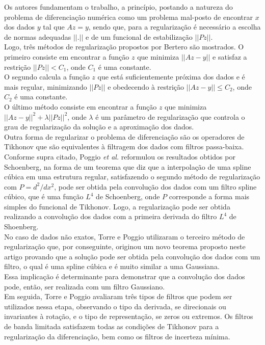\begin{enumerate}
\begin{enumerate}[label*=\arabic*.]
    Os autores fundamentam o trabalho, a princípio, postando a natureza do problema de diferenciação numérica como um problema mal-posto de encontrar $x$ dos dados $y$ tal que $Az = y$, sendo que, para a regularização é necessário a escolha de normas adequadas $||.||$ e de um funcional de estabilização $||Pz||$.
    \\[6pt]
    Logo, três métodos de regularização propostos por Bertero são mostrados. O primeiro consiste em encontrar a função $z$ que minimiza $||Az - y||$ e satisfaz a restrição $||Pz|| < C_{1}$, onde $C_{1}$ é uma constante.
    \\[6pt]
    O segundo calcula a função $z$ que está suficientemente próxima dos dados e é mais regular, minimizando $||Pz||$ e obedecendo à restrição $||Az - y|| \leq C_{2}$, onde $C_{2}$ é uma constante.
    \\[6pt]
    O último método consiste em encontrar a função $z$ que minimiza $||Az - y||^2 + \lambda ||Pz||^2$, onde $\lambda$ é um parâmetro de regularização que controla o grau de regularização da solução e a aproximação dos dados.
    \\[6pt]
    Outra forma de regularizar o problema de diferenciação são os operadores de Tikhonov que são equivalentes à filtragem dos dados com filtros passa-baixa.
    \\[6pt]
    Conforme supra citado, Poggio \textit{et al.} \cite{Poggio1988106} reformulou os resultados obtidos por Schoenberg, na forma de um teorema que diz que a interpolação de uma spline cúbica em uma estrutura regular, satisfazendo o segundo método de regularização com $P = d^2 / dx^2$, pode ser obtida pela convolução dos dados com um filtro spline cúbico, que é uma função $L^4$ de Schoenberg, onde $P$ corresponde a forma mais simples do funcional de Tikhonov. Logo, a regularização pode ser obtida realizando a convolução dos dados com a primeira derivada do filtro $L^4$ de Shoenberg.
    \\[6pt]
    No caso de dados não exatos, Torre e Poggio utilizaram o terceiro método de regularização que, por conseguinte, originou um novo teorema proposto neste artigo provando que a solução pode ser obtida pela convolução dos dados com um filtro, o qual é uma spline cúbica e é muito similar a uma Gaussiana.
    \\[6pt]
    Essa implicação é determinante para demonstrar que a convolução dos dados pode, então, ser realizada com um filtro Gaussiano.
    \\[6pt]
    Em seguida, Torre e Poggio avaliaram três tipos de filtros que podem ser utilizados nessa etapa, observando o tipo da derivada, se direcionais ou invariantes à rotação, e o tipo de representação, se zeros ou extremos. Os filtros de banda limitada satisfazem todas as condições de Tikhonov para a regularização da diferenciação, bem como os filtros de incerteza mínima.

\end{enumerate}
\end{enumerate}
